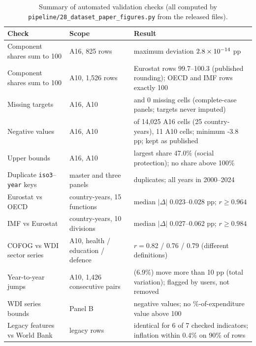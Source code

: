 \begin{table}[t]
\caption{Summary of automated validation checks (all computed by \texttt{pipeline/28\_dataset\_paper\_figures.py} from the released files).}\label{tab:checks}
\centering\small
\renewcommand{\arraystretch}{1.1}
\begin{tabular}{@{}>{\raggedright\arraybackslash}p{3.8cm}>{\raggedright\arraybackslash}p{3.2cm}>{\raggedright\arraybackslash}p{7.8cm}@{}}
\toprule
Check & Scope & Result \\
\midrule
Component shares sum to 100 & A16, 825 rows & maximum deviation $2.8\times10^{-14}$ pp \\
Component shares sum to 100 & A10, 1{,}526 rows & Eurostat rows 99.7--100.3 (published rounding); OECD and IMF rows exactly 100 \\
Missing targets & A16, A10 & 0 and 0 missing cells (complete-case panels; targets never imputed) \\
Negative values & A16, A10 & 27 of 14{,}025 A16 cells (25 country-years), 11 A10 cells; minimum -3.8 pp; kept as published \\
Upper bounds & A16, A10 & largest share 47.0\% (social protection); no share above 100\% \\
Duplicate \texttt{iso3}--\texttt{year} keys & master and three panels & 0 duplicates; all years in 2000--2024 \\
Eurostat vs OECD & 690 country-years, 15 functions & median $|\Delta|$ 0.023--0.028 pp; $r\ge0.964$ \\
IMF vs Eurostat & 723 country-years, 10 divisions & median $|\Delta|$ 0.027--0.062 pp; $r\ge0.984$ \\
COFOG vs WDI sector series & A10, health / education / defence & $r=$0.82 / 0.76 / 0.79 (different definitions) \\
Year-to-year jumps & A10, 1{,}426 consecutive pairs & 98 (6.9\%) move more than 10 pp (total variation); flagged by users, not removed \\
WDI series bounds & Panel B & 0 negative values; no \%-of-expenditure value above 100 \\
Legacy features vs World Bank & 750 legacy rows & identical for 6 of 7 checked indicators; inflation within 0.4\% on 90\% of rows \\
\bottomrule
\end{tabular}
\end{table}
